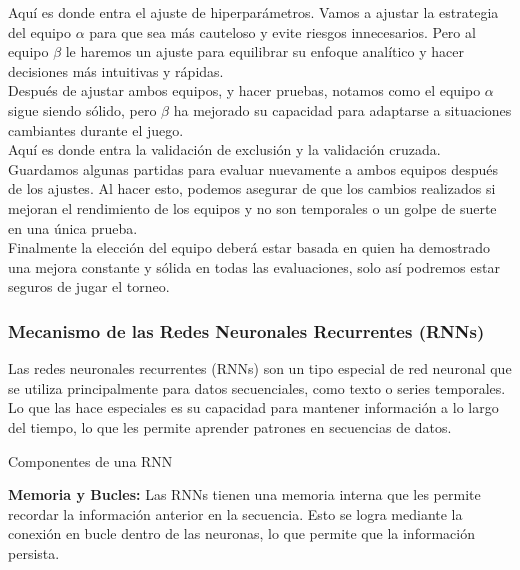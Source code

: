 Aquí es donde entra el ajuste de hiperparámetros. Vamos a ajustar la estrategia del equipo 
$\alpha$ para que sea más cauteloso y evite riesgos innecesarios. Pero al equipo $\beta$ le 
haremos un ajuste para equilibrar su enfoque analítico y hacer decisiones más intuitivas y rápidas.\\ 

Después de ajustar ambos equipos, y hacer pruebas, notamos como el equipo $\alpha$ sigue siendo sólido, 
pero $\beta$ ha mejorado su capacidad para adaptarse a situaciones cambiantes durante el juego.\\ 

Aquí es donde entra la validación de exclusión y la validación cruzada. Guardamos algunas partidas 
para evaluar nuevamente a ambos equipos después de los ajustes. Al hacer esto, podemos asegurar de 
que los cambios realizados si mejoran el rendimiento de los equipos y no son temporales o un golpe 
de suerte en una única prueba.\\ 

Finalmente la elección del equipo deberá estar basada en quien ha demostrado una mejora constante y 
sólida en todas las evaluaciones, solo así podremos estar seguros de jugar el torneo.


\subsubsection*{Mecanismo de las Redes Neuronales Recurrentes (RNNs)}


Las redes neuronales recurrentes (RNNs) son un tipo especial de red neuronal que se utiliza 
principalmente para datos secuenciales, como texto o series temporales. Lo que las hace especiales 
es su capacidad para mantener información a lo largo del tiempo, lo que les permite aprender 
patrones en secuencias de datos.

\begin{center}
    Componentes de una RNN
\end{center}

\textbf{Memoria y Bucles:} Las RNNs tienen una memoria interna que les permite recordar la 
información anterior en la secuencia. Esto se logra mediante la conexión en bucle dentro de las 
neuronas, lo que permite que la información persista.\\

